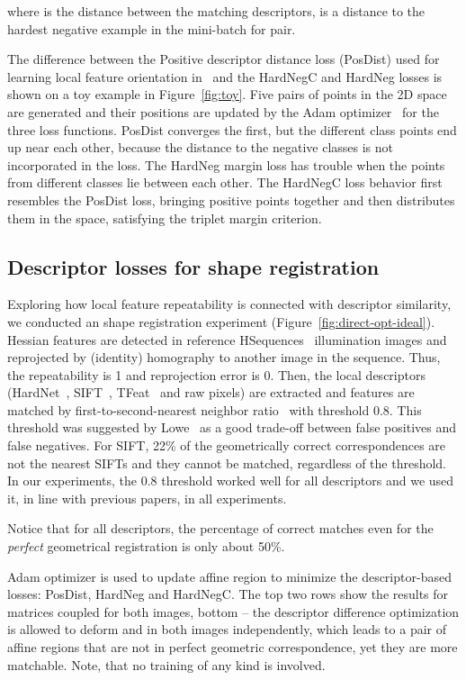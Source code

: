 \documentclass[runningheads]{llncs}
\begin{document}
where  is the distance between the matching descriptors,  is a distance to the hardest negative example  in the mini-batch for  pair.

The difference between the Positive descriptor distance loss (PosDist) used for learning local feature orientation in~\cite{OriNet2016} and the HardNegC and HardNeg losses is shown on a toy example in Figure~\ref{fig:toy}. Five pairs of points in the 2D space are generated and their positions are updated by the Adam optimizer~\cite{Adam2014} for the three loss functions. PosDist converges the first, but the different class points end up near each other, because the distance to the negative classes is not incorporated in the loss. The HardNeg margin loss has trouble when the points from different classes lie between each other. The HardNegC loss behavior first resembles the PosDist loss, bringing positive points together and then distributes them in the space, satisfying the triplet margin criterion.
\subsection{Descriptor losses for shape registration}Exploring how local feature repeatability is connected with descriptor similarity, we conducted an shape registration experiment (Figure~\ref{fig:direct-opt-ideal}). Hessian features are detected in reference HSequences~\cite{hpatches2017} illumination images and reprojected by (identity) homography to another image in the sequence. Thus, the repeatability is 1 and reprojection error is 0. Then, the local descriptors (HardNet~\cite{HardNet2017}, SIFT~\cite{SIFT2004}, TFeat~\cite{TFeat2016} and raw pixels) are extracted and features are matched by first-to-second-nearest neighbor ratio~\cite{SIFT2004} with threshold 0.8.  This threshold was suggested by Lowe~\cite{SIFT2004} as a good trade-off between false positives and false negatives. For SIFT, 22\% of the geometrically correct correspondences are not the nearest SIFTs and they cannot be matched, regardless of the threshold. In our experiments, the 0.8 threshold worked well for all descriptors and we used it, in line with previous papers, in all experiments.

Notice that for all descriptors, the percentage of correct matches even for the \emph{perfect} geometrical registration is only about 50\%. 

Adam optimizer is used to update affine region  to minimize the descriptor-based losses: PosDist, HardNeg and HardNegC. 
The top two rows show the results for  matrices coupled for both images, bottom -- the descriptor difference optimization is allowed to deform  and  in both images independently, which leads to a pair of affine regions that are not in perfect geometric correspondence, yet they are more matchable. Note, that no training of any kind is involved. 
\end{document}
